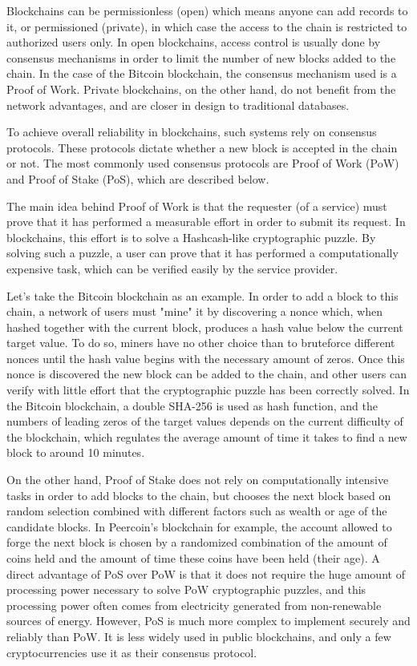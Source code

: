\documentclass{article}
\begin{document}
Blockchains can be permissionless (open) which means anyone can add records to it, or permissioned (private), in which case the access to the chain is restricted to authorized users only. In open blockchains, access control is usually done by consensus mechanisms in order to limit the number of new blocks added to the chain. In the case of the Bitcoin blockchain, the consensus mechanism used is a Proof of Work.
Private blockchains, on the other hand, do not benefit from the network advantages, and are closer in design to traditional databases.

\bigskip

To achieve overall reliability in blockchains, such systems rely on consensus protocols. These protocols dictate whether a new block is accepted in the chain or not. The most commonly used consensus protocols are Proof of Work (PoW) and Proof of Stake (PoS), which are described below.

\bigskip

The main idea behind Proof of Work is that the requester (of a service) must prove that it has performed a measurable effort in order to submit its request. In blockchains, this effort is to solve a Hashcash-like\cite{back2002hashcash} cryptographic puzzle. By solving such a puzzle, a user can prove that it has performed a computationally expensive task, which can be verified easily by the service provider.


Let's take the Bitcoin blockchain as an example. In order to add a block to this chain, a network of users must "mine" it by discovering a nonce which, when hashed together with the current block, produces a hash value below the current target value. To do so, miners have no other choice than to bruteforce different nonces until the hash value begins with the necessary amount of zeros. Once this nonce is discovered the new block can be added to the chain, and other users can verify with little effort that the cryptographic puzzle has been correctly solved. In the Bitcoin blockchain, a double SHA-256 is used as hash function, and the numbers of leading zeros of the target values depends on the current difficulty of the blockchain, which regulates the average amount of time it takes to find a new block to around 10 minutes.

\bigskip

On the other hand, Proof of Stake does not rely on computationally intensive tasks in order to add blocks to the chain, but chooses the next block based on random selection combined with different factors such as wealth or age of the candidate blocks. In Peercoin's blockchain for example, the account allowed to forge the next block is chosen by a randomized combination of the amount of coins held and the amount of time these coins have been held (their age). A direct advantage of PoS over PoW is that it does not require the huge amount of processing power necessary to solve PoW cryptographic puzzles, and this processing power often comes from electricity generated from non-renewable sources of energy. However, PoS is much more complex to implement securely and reliably than PoW. It is less widely used in public blockchains, and only a few cryptocurrencies use it as their consensus protocol.
\end{document}
